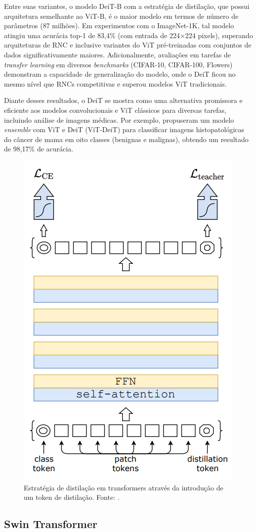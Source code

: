 Entre suas variantes, o modelo DeiT-B com a estratégia de distilação, que possui arquitetura semelhante ao ViT-B, é o maior modelo em termos de número de parâmetros (87 milhões). Em experimentos com o ImageNet-1K, tal modelo atingiu uma acurácia top-1 de 83,4\% (com entrada de 224×224 pixels), superando arquiteturas de RNC e inclusive variantes do ViT pré-treinadas com conjuntos de dados significativamente maiores. Adicionalmente, avaliações em tarefas de \textit{transfer learning} em diversos \textit{benchmarks} (CIFAR-10, CIFAR-100, Flowers) demonstram a capacidade de generalização do modelo, onde o DeiT ficou no mesmo nível que RNCs competitivas e superou modelos ViT tradicionais.

Diante desses resultados, o DeiT se mostra como uma alternativa promissora e eficiente aos modelos convolucionais e ViT clássicos para diversas tarefas, incluindo análise de imagens médicas. Por exemplo,  propuseram um modelo \textit{ensemble} com ViT e DeiT (ViT-DeiT) para classificar imagens histopatológicas do câncer de mama em oito classes (benignas e malignas), obtendo um resultado de 98,17\% de acurácia.

\begin{figure}[!htbp]
    \centering
    \includegraphics[width=0.5\linewidth]{figs/distillation-procedure-deit.png}
    \caption{Estratégia de distilação em transformers através da introdução de um token de distilação. Fonte: .}
    \label{fig:distillation-procedure}
\end{figure}

\subsection{Swin Transformer}

